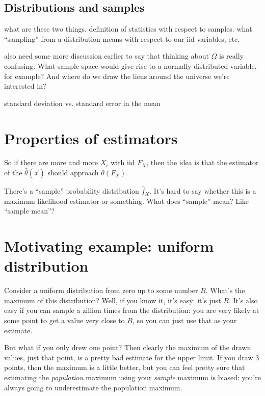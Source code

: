 \subsection{Distributions and samples}

what are these two things. definition of statistics with respect to samples.
what ``sampling'' from a distribution means with respect to our iid variables,
etc.

also need some more discussion earlier to say that thinking about $\Omega$ is
really confusing. What sample space would give rise to a normally-distributed
variable, for example? And where do we draw the liens around the universe we're
interested in? 

standard deviation vs. standard error in the mean

\section{Properties of estimators}

So if there are more and more $X_i$ with iid $F_X$, then the idea is that the estimator of the $\hat{\theta}(\vec{x})$ should approach $\theta(F_X)$.

There's a ``sample'' probability distribution $\hat{f}_X$. It's hard to say whether this is a maximum likelihood estimator or something. What does ``sample'' mean? Like ``sample mean''?

\section{Motivating example: uniform
distribution}\label{motivating-example-uniform-distribution}

Consider a uniform distribution from zero up to some number \(B\).
What's the maximum of this distribution? Well, if you know it, it's
easy: it's just \(B\). It's also easy if you can sample a zillion times
from the distribution: you are very likely at some point to get a value
very close to \(B\), so you can just use that as your estimate.

But what if you only drew one point? Then clearly the maximum of the
drawn values, just that point, is a pretty bad estimate for the upper
limit. If you draw 3 points, then the maximum is a little better, but
you can feel pretty sure that estimating the \emph{population} maximum
using your \emph{sample} maximum is biased: you're always going to
underestimate the population maximum.

